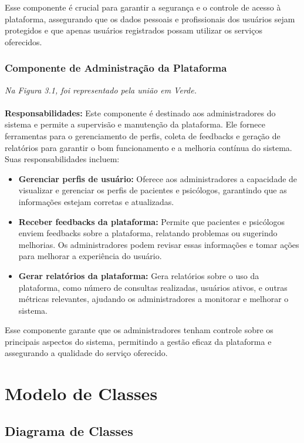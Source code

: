 \documentclass[a4paper,12pt]{report}
\begin{document}
Esse componente é crucial para garantir a segurança e o controle de acesso à plataforma, assegurando que os dados pessoais e profissionais dos usuários sejam protegidos e que apenas usuários registrados possam utilizar os serviços oferecidos.


\subsection{ Componente de Administração da Plataforma}
\textit{Na Figura 3.1, foi representado pela união em Verde.} \\ 
\\
\textbf{Responsabilidades:} 
Este componente é destinado aos administradores do sistema e permite a supervisão e manutenção da plataforma. Ele fornece ferramentas para o gerenciamento de perfis, coleta de feedbacks e geração de relatórios para garantir o bom funcionamento e a melhoria contínua do sistema. Suas responsabilidades incluem:

\begin{itemize}
    \item \textbf{Gerenciar perfis de usuário:} Oferece aos administradores a capacidade de visualizar e gerenciar os perfis de pacientes e psicólogos, garantindo que as informações estejam corretas e atualizadas.
    \item \textbf{Receber feedbacks da plataforma:} Permite que pacientes e psicólogos enviem feedbacks sobre a plataforma, relatando problemas ou sugerindo melhorias. Os administradores podem revisar essas informações e tomar ações para melhorar a experiência do usuário.
    \item \textbf{Gerar relatórios da plataforma:} Gera relatórios sobre o uso da plataforma, como número de consultas realizadas, usuários ativos, e outras métricas relevantes, ajudando os administradores a monitorar e melhorar o sistema.
\end{itemize}

Esse componente garante que os administradores tenham controle sobre os principais aspectos do sistema, permitindo a gestão eficaz da plataforma e assegurando a qualidade do serviço oferecido.

\chapter{Modelo de Classes}

\section{Diagrama de Classes}
\end{document}
